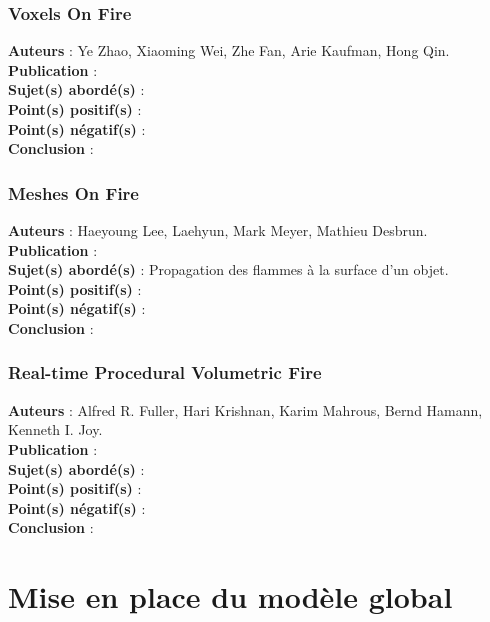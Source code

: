 \documentclass[a4paper,10pt]{article}
\begin{document}
\subsubsection{Voxels On Fire}
\textbf{Auteurs} : Ye Zhao, Xiaoming Wei, Zhe Fan, Arie Kaufman, Hong Qin.\\
\textbf{Publication} :\\
\textbf{Sujet(s) abordé(s)} : \\
\textbf{Point(s) positif(s)} :\\
\textbf{Point(s) négatif(s)} :\\
\textbf{Conclusion} :\\

\subsubsection{Meshes On Fire}
\textbf{Auteurs} : Haeyoung Lee, Laehyun, Mark Meyer, Mathieu Desbrun.\\
\textbf{Publication} :\\
\textbf{Sujet(s) abordé(s)} : Propagation des flammes à la surface d'un objet.\\
\textbf{Point(s) positif(s)} :\\
\textbf{Point(s) négatif(s)} :\\
\textbf{Conclusion} :\\

\subsubsection{Real-time Procedural Volumetric Fire}
\textbf{Auteurs} : Alfred R. Fuller, Hari Krishnan, Karim Mahrous, Bernd Hamann, Kenneth I. Joy.\\
\textbf{Publication} :\\
\textbf{Sujet(s) abordé(s)} : \\
\textbf{Point(s) positif(s)} :\\
\textbf{Point(s) négatif(s)} :\\
\textbf{Conclusion} :\\



\section{Mise en place du modèle global}
\end{document}
